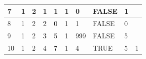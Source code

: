 \begin{table}[h!]
\begin{tabular}{|l|l|l|l|l|l|l|l|l|l|}
		7                                                           & 1                                                       & 2                                                       & 1                                                       & 1                                                                        & 1                                                                        & 0                                                                        & FALSE                                                           & 1                                                                        &                                                               \\ \hline
		8                                                           & 1                                                       & 2                                                       & 2                                                       & 0                                                                        & 1                                                                        & 1                                                                        & FALSE                                                           & 0                                                                        &                                                               \\ \hline
		9                                                           & 1                                                       & 2                                                       & 3                                                       & 5                                                                        & 1                                                                        & 999                                                                      & FALSE                                                           & 5                                                                        &                                                               \\ \hline
		\rowcolor[HTML]{FCFF2F} 
		10                                                          & 1                                                       & 2                                                       & 4                                                       & 7                                                                        & 1                                                                        & 4                                                                        & TRUE                                                            & 5                                                                        & 1                                                             \\ \hline

\end{tabular}
\end{table}
